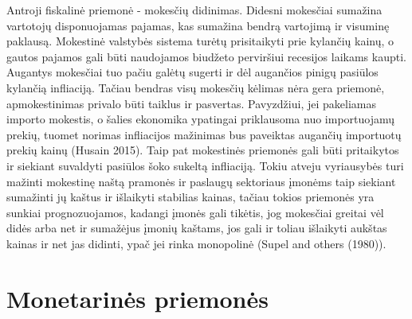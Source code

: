 \documentclass[
]{article}
\begin{document}
Antroji fiskalinė priemonė - mokesčių didinimas. Didesni mokesčiai
sumažina vartotojų disponuojamas pajamas, kas sumažina bendrą vartojimą
ir visuminę paklausą. Mokestinė valstybės sistema turėtų prisitaikyti
prie kylančių kainų, o gautos pajamos gali būti naudojamos biudžeto
perviršiui recesijos laikams kaupti. Augantys mokesčiai tuo pačiu galėtų
sugerti ir dėl augančios pinigų pasiūlos kylančią infliaciją. Tačiau
bendras visų mokesčių kėlimas nėra gera priemonė, apmokestinimas privalo
būti taiklus ir pasvertas. Pavyzdžiui, jei pakeliamas importo mokestis,
o šalies ekonomika ypatingai priklausoma nuo importuojamų prekių, tuomet
norimas infliacijos mažinimas bus paveiktas augančių importuotų prekių
kainų (Husain 2015). Taip pat mokestinės priemonės gali būti pritaikytos
ir siekiant suvaldyti pasiūlos šoko sukeltą infliaciją. Tokiu atveju
vyriausybės turi mažinti mokestinę naštą pramonės ir paslaugų sektoriaus
įmonėms taip siekiant sumažinti jų kaštus ir išlaikyti stabilias kainas,
tačiau tokios priemonės yra sunkiai prognozuojamos, kadangi įmonės gali
tikėtis, jog mokesčiai greitai vėl didės arba net ir sumažėjus įmonių
kaštams, jos gali ir toliau išlaikyti aukštas kainas ir net jas didinti,
ypač jei rinka monopolinė (Supel and others (1980)).

\hypertarget{monetarinux117s-priemonux117s}{%
\section{Monetarinės priemonės}\label{monetarinux117s-priemonux117s}}
\end{document}
